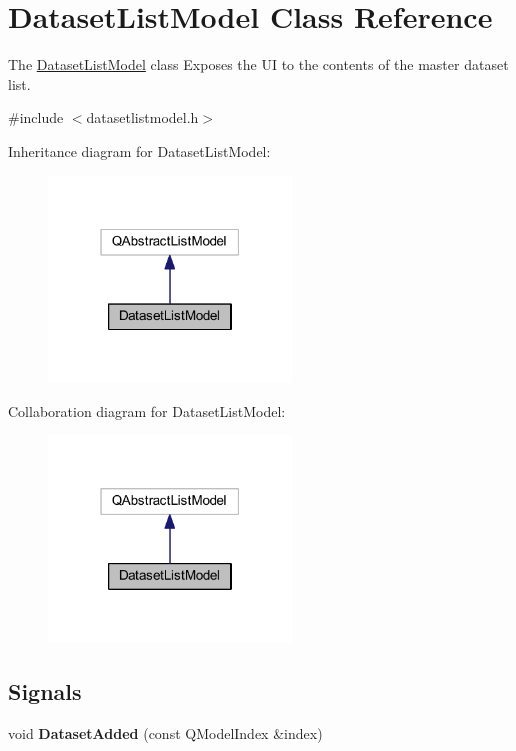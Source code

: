 \hypertarget{class_dataset_list_model}{\section{Dataset\+List\+Model Class Reference}
\label{class_dataset_list_model}
}


The \hyperlink{class_dataset_list_model}{Dataset\+List\+Model} class Exposes the U\+I to the contents of the master dataset list.  




{\ttfamily \#include $<$datasetlistmodel.\+h$>$}



Inheritance diagram for Dataset\+List\+Model\+:\nopagebreak
\begin{figure}[H]
\begin{center}
\leavevmode
\includegraphics[width=183pt]{class_dataset_list_model__inherit__graph}
\end{center}
\end{figure}


Collaboration diagram for Dataset\+List\+Model\+:\nopagebreak
\begin{figure}[H]
\begin{center}
\leavevmode
\includegraphics[width=183pt]{class_dataset_list_model__coll__graph}
\end{center}
\end{figure}
\subsection*{Signals}
\begin{DoxyCompactItemize}
\item 
\hypertarget{class_dataset_list_model_a86428aaae4fe37364d16b95c1a40415c}{void {\bfseries Dataset\+Added} (const Q\+Model\+Index \&index)}\label{class_dataset_list_model_a86428aaae4fe37364d16b95c1a40415c}

\end{DoxyCompactItemize}

